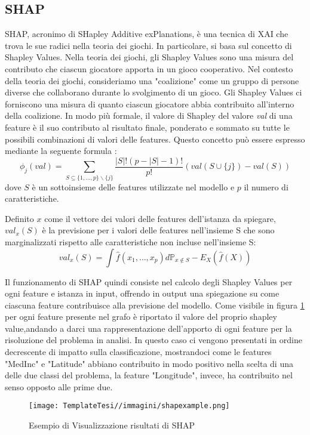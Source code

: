 \begin{flushleft}
\subsection{SHAP}
SHAP, acronimo di SHapley Additive exPlanations, è una tecnica di XAI che trova le sue radici nella teoria dei giochi. In particolare, si basa sul concetto di Shapley Values.
Nella teoria dei giochi, gli Shapley Values sono una misura del contributo che ciascun giocatore apporta in un gioco cooperativo. Nel contesto della teoria dei giochi, consideriamo una "coalizione" come un gruppo di persone diverse che collaborano durante lo svolgimento di un gioco. Gli Shapley Values ci forniscono una misura di quanto ciascun giocatore abbia contribuito all'interno della coalizione.
In modo più formale, il valore di Shapley del valore \emph{val} di una feature è il suo contributo al risultato finale, ponderato e sommato su tutte le possibili combinazioni di valori delle features. Questo concetto può essere espresso mediante la seguente formula \cite{interpretableml}:
$$\phi_j(val)=\sum_{S\subseteq\{1,\ldots,p\} \backslash \{j\}}\frac{|S|!\left(p-|S|-1\right)!}{p!}\left(val\left(S\cup\{j\}\right)-val(S)\right)$$
dove  $S$ è un sottoinsieme delle features utilizzate nel modello e $p$ il numero di caratteristiche.  

Definito $x$ come il vettore dei valori delle features dell'istanza da spiegare,
\(val_x(S)\) è la previsione per i valori delle features nell'insieme S che sono marginalizzati rispetto alle caratteristiche non incluse nell'insieme S:
$$val_{x}(S)=\int\hat{f}(x_{1},\ldots,x_{p})d\mathbb{P}_{x\notin{}S}-E_X(\hat{f}(X))$$

Il funzionamento di SHAP quindi consiste nel calcolo degli Shapley Values per ogni feature e istanza in input, offrendo in output una spiegazione su come ciascuna feature contribuisce alla previsione del modello.
Come visibile in figura \ref{fig:risultatiSHAP}
per ogni feature presente nel grafo è riportato il valore del proprio shapley value,andando a darci una rappresentazione dell'apporto di ogni feature per la risoluzione del problema in analisi.
In questo caso ci vengono presentati in ordine decrescente di impatto sulla classificazione, mostrandoci come le features "MedInc" e "Latitude" abbiano contribuito in modo positivo nella scelta di una delle due classi del problema, la feature "Longitude", invece, ha contribuito nel senso opposto alle prime due.
\begin{figure}[H]
    \centering
    \texttt{[image: TemplateTesi//immagini/shapexample.png]}
    \caption{Esempio di Visualizzazione risultati di SHAP \cite{ImmShapExample}}
    \label{fig:risultatiSHAP}
\end{figure}



\end{flushleft}
